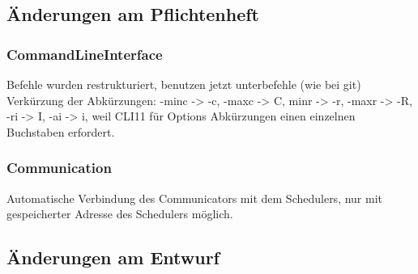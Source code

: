 \documentclass[a4paper,12pt]{article}
\begin{document}
\subsection{Änderungen am Pflichtenheft}
\subsubsection{CommandLineInterface}
\vspace{0.2cm}
Befehle wurden restrukturiert, benutzen jetzt unterbefehle (wie bei git)
Verkürzung der Abkürzungen: -minc -> -c, -maxc -> C, minr -> -r, -maxr -> -R, -ri -> I, -ai -> i, weil CLI11 für Options Abkürzungen einen einzelnen Buchstaben erfordert.

\subsubsection{Communication}
\vspace{0.2cm}
Automatische Verbindung des Communicators mit dem Schedulers, nur mit gespeicherter Adresse des Schedulers möglich.
\subsection{Änderungen am Entwurf}
\end{document}
